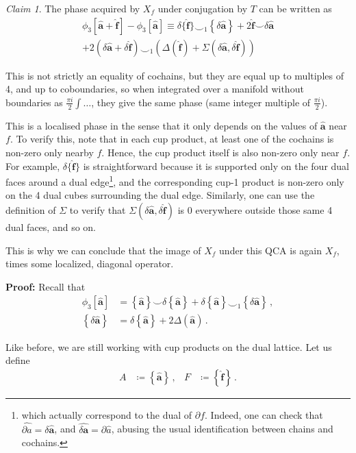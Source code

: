 \documentclass[aps,twocolumn,prx,floatfix,preprintnumbers, nofootinbib,10pt]{revtex4-2}
\numberwithin{equation}{section}
\theoremstyle{definition}
\theoremstyle{remark}
\theoremstyle{claim}
\newtheorem{claim}[theorem]{Claim}
\newcommand{\lbbb}{\left\{}
\newcommand{\rbbb}{\right\}}
\newcommand{\lrb}[1]{\lbbb #1 \rbbb}
\begin{document}
\begin{claim}
The phase acquired by $X_f$ under conjugation by $T$ can be written as
\begin{multline}
 \phi_3[\bm{\hat{a}}+\bm{\hat{f}}]-\phi_3[\bm{\hat{a}}] 
 \equiv \delta{\{\bm{\hat{f}}}\}\smile_1 \lrb{\delta \bm{\hat{a}}} + 2 \bm{\hat{f}} \smile \delta \bm{\hat{a}} \\
 + 2 \left( \delta{\bm{\hat{a}}}+\delta{\bm{\hat{f}}} \right) \smile_1 \left( \Delta(\bm{\hat{f}})+\Sigma(\delta{\bm{\hat{a}}},\delta{\bm{\hat{f}}}) \right)
\end{multline}

This is not strictly an equality of cochains, but they are equal up to multiples of 4, and up to coboundaries, so when integrated over a manifold without boundaries as $\frac{\pi i}{2} \int \dots$, they give the same phase (same integer multiple of $\frac{\pi i}{2}$).
\end{claim}
This is a localised phase in the sense that it only depends on the values of $\bm{\hat{a}}$ near $f$. To verify this, note that in each cup product, at least one of the cochains is non-zero only nearby $f$. Hence, the cup product itself is also non-zero only near $f$. For example, $\delta \{ \bm{\hat{f}} \}$ is straightforward because it is supported only on the four dual faces around a dual edge\footnote{which actually correspond to the dual of $\partial f$. Indeed, one can check that $\widehat{\partial a} = \delta \hat{\bm{a}}$, and $\widehat{\delta \bm{a}} = \partial \hat{a}$, abusing the usual identification between chains and cochains.}, and the corresponding cup-1 product is non-zero only on the 4 dual cubes surrounding the dual edge. Similarly, one can use the definition of $\Sigma$ to verify that $\Sigma(\delta \bm{\hat{a}}, \delta \bm{\hat{f}})$ is 0 everywhere outside those same 4 dual faces, and so on.

This is why we can conclude that the image of $X_f$ under this QCA is again $X_f$, times some localized, diagonal operator.

{\bf Proof:}
Recall that
\begin{align}
\phi_3[\bm{\hat{a}}] &= \lrb{\bm{\hat{a}}} \smile \delta \lrb{\bm{\hat{a}}} + \delta \lrb{\bm{\hat{a}}} \smile_1 \lrb{\delta \bm{\hat{a}}} \,, \\
\lrb{\delta \bm{\hat{a}}} &= \delta \lrb{\bm{\hat{a}}} + 2 \Delta(\bm{\hat{a}}) \,.
\end{align}

Like before, we are still working with cup products on the dual lattice. Let us define
\begin{align}
 A &\coloneqq \lrb{\bm{\hat{a}}} \,, & F &\coloneqq \lrb{\bm{\hat{f}}} \,. 
\end{align}
\end{document}
